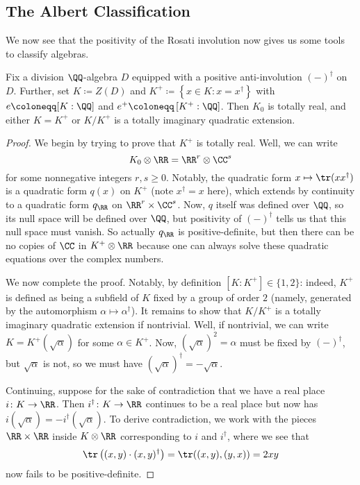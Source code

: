 \documentclass[../notes.tex]{subfiles}
\begin{document}
\subsection{The Albert Classification}
We now see that the positivity of the Rosati involution now gives us some tools to classify algebras.
\begin{lemma}
	Fix a division $\QQ$-algebra $D$ equipped with a positive anti-involution $(-)^\dagger$ on $D$. Further, set $K\coloneqq Z(D)$ and $K^+\coloneqq\left\{x\in K:x=x^\dagger\right\}$ with $e\coloneqq[K:\QQ]$ and $e^+\coloneqq\left[K^+:\QQ\right]$. Then $K_0$ is totally real, and either $K=K^+$ or $K/K^+$ is a totally imaginary quadratic extension.
\end{lemma}
\begin{proof}
	We begin by trying to prove that $K^+$ is totally real. Well, we can write
	\[K_0\otimes\RR=\RR^r\otimes\CC^s\]
	for some nonnegative integers $r,s\ge0$. Notably, the quadratic form $x\mapsto\tr(xx^\dagger)$ is a quadratic form $q(x)$ on $K^+$ (note $x^\dagger=x$ here), which extends by continuity to a quadratic form $q_\RR$ on $\RR^r\times\CC^s$. Now, $q$ itself was defined over $\QQ$, so its null space will be defined over $\QQ$, but positivity of $(-)^\dagger$ tells us that this null space must vanish. So actually $q_\RR$ is positive-definite, but then there can be no copies of $\CC$ in $K^+\otimes\RR$ because one can always solve these quadratic equations over the complex numbers.

	We now complete the proof. Notably, by definition $\left[K:K^+\right]\in\{1,2\}$: indeed, $K^+$ is defined as being a subfield of $K$ fixed by a group of order $2$ (namely, generated by the automorphism $\alpha\mapsto\alpha^\dagger$). It remains to show that $K/K^+$ is a totally imaginary quadratic extension if nontrivial. Well, if nontrivial, we can write $K=K^+(\sqrt\alpha)$ for some $\alpha\in K^+$. Now, $(\sqrt\alpha)^2=\alpha$ must be fixed by $(-)^\dagger$, but $\sqrt\alpha$ is not, so we must have $(\sqrt\alpha)^\dagger=-\sqrt\alpha$.
	
	Continuing, suppose for the sake of contradiction that we have a real place $i\colon K\to\RR$. Then $i^\dagger\colon K\to\RR$ continues to be a real place but now has $i(\sqrt\alpha)=-i^\dagger(\sqrt\alpha)$. To derive contradiction, we work with the pieces $\RR\times\RR$ inside $K\otimes\RR$ corresponding to $i$ and $i^\dagger$, where we see that
	\[\tr\left((x,y)\cdot(x,y)^\dagger\right)=\tr((x,y),(y,x))=2xy\]
	now fails to be positive-definite.
\end{proof}
\end{document}
